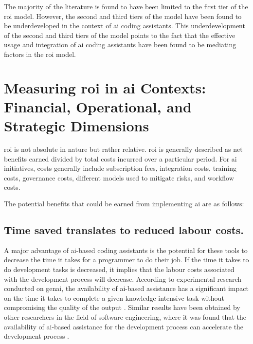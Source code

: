 The majority of the literature is found to have been limited to the first tier of the \gls{roi} model. However, the second and third tiers of the model have been found to be underdeveloped in the context of \gls{ai} coding assistants. This underdevelopment of the second and third tiers of the model points to the fact that the effective usage and integration of \gls{ai} coding assistants have been found to be mediating factors in the \gls{roi} model.	

\section{Measuring \gls{roi} in \gls{ai} Contexts: Financial, Operational, and Strategic Dimensions}
\label{sec:Measuring ROI in AI Contexts: Financial, Operational, and Strategic Dimensions}
\gls{roi} is not absolute in nature but rather relative. \gls{roi} is generally described as net benefits earned divided by total costs incurred over a particular period. For \gls{ai} initiatives, costs generally include subscription fees, integration costs, training costs, governance costs, different models used to mitigate risks, and workflow costs. 

The potential benefits that could be earned from implementing \gls{ai} are as follows: 
\subsection {Time saved translates to reduced labour costs.}
\label{sec:Time saved translates to reduced labour costs}
A major advantage of \gls{ai}-based coding assistants is the potential for these tools to decrease the time it takes for a programmer to do their job. If the time it takes to do development tasks is decreased, it implies that the labour costs associated with the development process will decrease. According to experimental research conducted on \gls{genai}, the availability of \gls{ai}-based assistance has a significant impact on the time it takes to complete a given knowledge-intensive task without compromising the quality of the output \autocite{Noy2023}. Similar results have been obtained by other researchers in the field of software engineering, where it was found that the availability of \gls{ai}-based assistance for the development process can accelerate the development process \autocite{Peng2023}.


